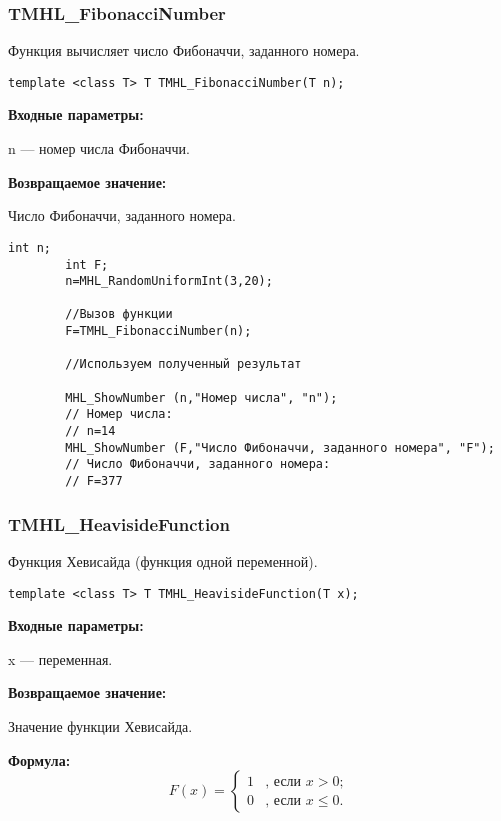 \documentclass[a4paper,12pt]{article}
\begin{document}
\subsubsection{TMHL\_FibonacciNumber}\label{TMHL_FibonacciNumber}

Функция вычисляет число Фибоначчи, заданного номера.


\begin{lstlisting}[label=code_syntax_TMHL_FibonacciNumber,caption=Синтаксис]
template <class T> T TMHL_FibonacciNumber(T n);
\end{lstlisting}

\textbf{Входные параметры:}  
 
 n --- номер числа Фибоначчи.

\textbf{Возвращаемое значение:}
 
 Число Фибоначчи, заданного номера.


\begin{lstlisting}[label=code_use_TMHL_FibonacciNumber,caption=Пример использования]
        int n;
        int F;
        n=MHL_RandomUniformInt(3,20);

        //Вызов функции
        F=TMHL_FibonacciNumber(n);

        //Используем полученный результат

        MHL_ShowNumber (n,"Номер числа", "n");
        // Номер числа:
        // n=14
        MHL_ShowNumber (F,"Число Фибоначчи, заданного номера", "F");
        // Число Фибоначчи, заданного номера:
        // F=377
\end{lstlisting}

\subsubsection{TMHL\_HeavisideFunction}\label{TMHL_HeavisideFunction}

Функция Хевисайда (функция одной переменной).


\begin{lstlisting}[label=code_syntax_TMHL_HeavisideFunction,caption=Синтаксис]
template <class T> T TMHL_HeavisideFunction(T x);
\end{lstlisting}

\textbf{Входные параметры:}

 x --- переменная.

\textbf{Возвращаемое значение:}
 
 Значение функции Хевисайда.
 
\textbf{Формула:}
\begin{equation*}
F\left(x \right)=\left\lbrace \begin{aligned}
1&\text{, если } x>0; \\
0&\text{, если } x\leq 0.
\end{aligned}\right. 
\end{equation*}
\end{document}
